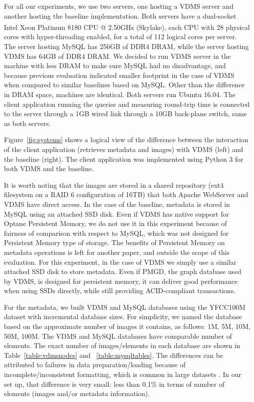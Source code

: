 For all our experiments, we use two servers, one hosting a VDMS server and
another hosting the baseline implementation.
Both servers have a dual-socket Intel\textsuperscript{\textregistered}
Xeon\textsuperscript{\textregistered} Platinum 8180 CPU @ 2.50GHz (Skylake),
each CPU with 28 physical cores with hyper-threading enabled,
for a total of 112 logical cores per server.
The server hosting MySQL has 256GB of DDR4 DRAM, while the server hosting VDMS
has 64GB of DDR4 DRAM.
We decided to run VDMS server in the machine with less DRAM to make
sure MySQL had no disadvantage, and because previous evaluation
indicated smaller footprint in the case of VDMS when
compared to similar baselines based on MySQL.
Other than the difference in DRAM space, machines are identical.
Both servers run Ubuntu 16.04.
The client application running the queries and measuring round-trip time
is connected to the server through a 1GB wired link through
a 10GB back-plane switch, same as both servers.

Figure~\ref{fig:systems} shows a logical view of the difference between the
interaction of the client application (retrieves metadata and
images) with VDMS (left) and the baseline (right).
The client application was implemented using Python 3 for both VDMS and
the baseline.

It is worth noting that the images are stored in a shared repository
(ext4 filesystem on a RAID 6 configuration of 16TB) that both 
Apache WebServer and VDMS have direct access. 
In the case of the baseline, metadata is
stored in MySQL using an attached SSD disk.
Even if VDMS has native support for Optane Persistent Memory,
we do not use it in this experiment because of fairness of
comparison with respect to MySQL, which was not designed for
Persistent Memory type of storage.
The benefits of Persistent Memory on metadata operations is left
for another paper, and outside the scope of this evaluation.
For this experiment, in the case of VDMS we simply use a similar
attached SSD disk to store metadata.
Even if PMGD, the graph database used by VDMS, is designed for persistent memory,
it can deliver good performance when using SSDs directly, while still
providing ACID-compliant transactions.

For the metadata, we built VDMS and MySQL databases
using the YFCC100M dataset with incremental database sizes.
For simplicity, we named the database based on the approximate number of images
it contains, as follows: 1M, 5M, 10M, 50M, 100M.
The VDMS and MySQL databases have comparable number of elements. 
The exact number of images/elements in each database are shown in
Table~\ref{table:vdmsnodes} and ~\ref{table:mysqltables}.
The differences can be attributed to failures in data 
preparation/loading because of incomplete/inconsistent formatting, 
which is common in large datasets \cite{failures}.
In our set up, that difference is very small: 
less than 0.1\% in terms of number of elements (images and/or metadata information).

